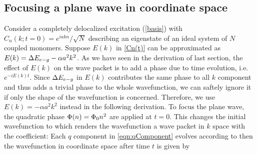 \subsection{Focusing a plane wave in coordinate space}
\label{sec:planewaveFocusing}

Consider a completely delocalized excitation (\ref{basis})
with $C_n(k;t=0) = {e^{iakn}}/{\sqrt{N}}$ describing an eigenstate
of an ideal system of $N$ coupled monomers.
Suppose $E(k)$ in \autoref{Cn(t)}  can be approximated as $E(k) = \Delta E_{e-g}
-\alpha a^2 k^2$. As we have seen in the derivation of last section, the effect of $E(k)$ on the wave packet is to
add a phase due to time evolution, i.e. $e^{-i E(k) t}$. Since $\Delta E_{e-g}$ in $E(k)$ contributes the same phase to all
$k$ component and thus adds a trivial phase to the whole wavefunction, we can saftely ignore it if only the shape of
the wavefunction is concerned. Therefore, we use   $E(k) = -\alpha a^2 k^2$ instead in the following derivation. To
focus the plane wave, the quadratic phase $\Phi(n) = \Phi_0
n^2$ are applied at $t=0$. This changes the initial wavefunction to 
which renders the wavefunction a wave packet in $k$ space with the coefficient:
Each $q$ component in \autoref{eqn:qComponent} evolves according to 
then the wavefunction in coordinate space after time $t$ is given by
%
